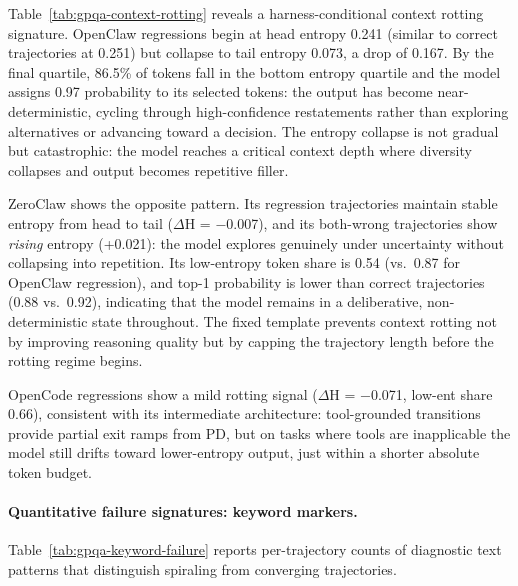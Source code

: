 Table~\ref{tab:gpqa-context-rotting} reveals a harness-conditional context
rotting signature.
OpenClaw regressions begin at head entropy 0.241 (similar to correct trajectories
at 0.251) but collapse to tail entropy 0.073, a drop of 0.167.
By the final quartile, 86.5\% of tokens fall in the bottom entropy quartile
and the model assigns 0.97 probability to its selected tokens: the output has
become near-deterministic, cycling through high-confidence restatements rather
than exploring alternatives or advancing toward a decision.
The entropy collapse is not gradual but catastrophic: the model reaches a
critical context depth where diversity collapses and output becomes repetitive
filler.

ZeroClaw shows the opposite pattern.
Its regression trajectories maintain stable entropy from head to tail
($\Delta$H = $-$0.007), and its both-wrong trajectories show \emph{rising}
entropy (+0.021): the model explores genuinely under uncertainty without
collapsing into repetition.
Its low-entropy token share is 0.54 (vs.\ 0.87 for OpenClaw regression), and
top-1 probability is lower than correct trajectories (0.88 vs.\ 0.92), indicating
that the model remains in a deliberative, non-deterministic state throughout.
The fixed template prevents context rotting not by improving reasoning quality
but by capping the trajectory length before the rotting regime begins.

OpenCode regressions show a mild rotting signal ($\Delta$H = $-$0.071, low-ent
share 0.66), consistent with its intermediate architecture: tool-grounded
transitions provide partial exit ramps from PD, but on tasks where tools are
inapplicable the model still drifts toward lower-entropy output, just within a
shorter absolute token budget.

\paragraph{Quantitative failure signatures: keyword markers.}

Table~\ref{tab:gpqa-keyword-failure} reports per-trajectory counts of
diagnostic text patterns that distinguish spiraling from converging trajectories.

